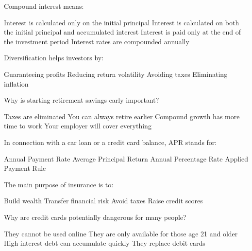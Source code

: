 \documentclass[12pt]{exam}
\begin{document}
\begin{questions}
	\begin{mcquestion}[2]
		Compound interest means:
		\begin{choices}
			\choice Interest is calculated only on the initial principal
			\CorrectChoice Interest is calculated on both the initial principal and accumulated interest
			\choice Interest is paid only at the end of the investment period
			\choice Interest rates are compounded annually
		\end{choices}
	\end{mcquestion}
	
	\begin{mcquestion}[2]
		Diversification helps investors by:
		\begin{choices}
			\choice Guaranteeing profits
			\CorrectChoice Reducing return volatility
			\choice Avoiding taxes
			\choice Eliminating inflation
		\end{choices}
	\end{mcquestion}
	
	\begin{mcquestion}[2]
		Why is starting retirement savings early important?
		\begin{choices}
			\choice Taxes are eliminated
			\choice You can always retire earlier
			\CorrectChoice Compound growth has more time to work
			\choice Your employer will cover everything
		\end{choices}
	\end{mcquestion}
	
	\begin{mcquestion}[2]
		In connection with a car loan or a credit card balance, APR stands for:
		\begin{choices}
			\choice Annual Payment Rate
			\choice Average Principal Return
			\CorrectChoice Annual Percentage Rate
			\choice Applied Payment Rule
		\end{choices}
	\end{mcquestion}
	
	\begin{mcquestion}[2]
		The main purpose of insurance is to:
		\begin{choices}
			\choice Build wealth
			\CorrectChoice Transfer financial risk
			\choice Avoid taxes
			\choice Raise credit scores
		\end{choices}
	\end{mcquestion}
	
	\begin{mcquestion}[2]
		Why are credit cards potentially dangerous for many people?
		\begin{choices}
			\choice They cannot be used online
			\choice They are only available for those age 21 and older
			\CorrectChoice High interest debt can accumulate quickly
			\choice They replace debit cards
		\end{choices}
	\end{mcquestion}
	

\end{questions}
\end{document}
